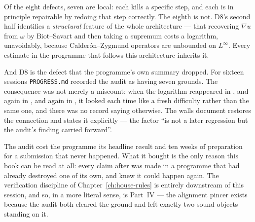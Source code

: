 \begin{obsv}
\label{obs:d8-lost}
Of the eight defects, seven are local: each kills a specific step, and each is
in principle repairable by redoing that step correctly. The eighth is not.
D8's second half identifies a \emph{structural} feature of the whole
architecture --- that recovering \(\nabla u\) from \(\omega\) by Biot--Savart
and then taking a supremum costs a logarithm, unavoidably, because
Calder\'on--Zygmund operators are unbounded on \(L^\infty\). Every estimate in
the programme that follows this architecture inherits it.

And D8 is the defect that the programme's own summary dropped. For sixteen
sessions \texttt{PROGRESS.md} recorded the audit as having seven grounds. The
consequence was not merely a miscount: when the logarithm reappeared in
, and again in , and again in , it looked each time like
a fresh difficulty rather than the same one, and there was no record saying
otherwise. The  walls document restores the connection and states it
explicitly --- the factor ``is not a later regression but the audit's finding
carried forward''.
\end{obsv}

\begin{obsv}
\label{obs:audit-economics}
The audit cost the programme its headline result and ten weeks of preparation
for a submission that never happened. What it bought is the only reason this
book can be read at all: every claim after  was made in a programme
that had already destroyed one of its own, and knew it could happen again.
The verification discipline of Chapter~\ref{ch:house-rules} is entirely
downstream of this session, and so, in a more literal sense, is Part~IV --- the
alignment pincer exists because the audit both cleared the ground and left
exactly two sound objects standing on it.
\end{obsv}
